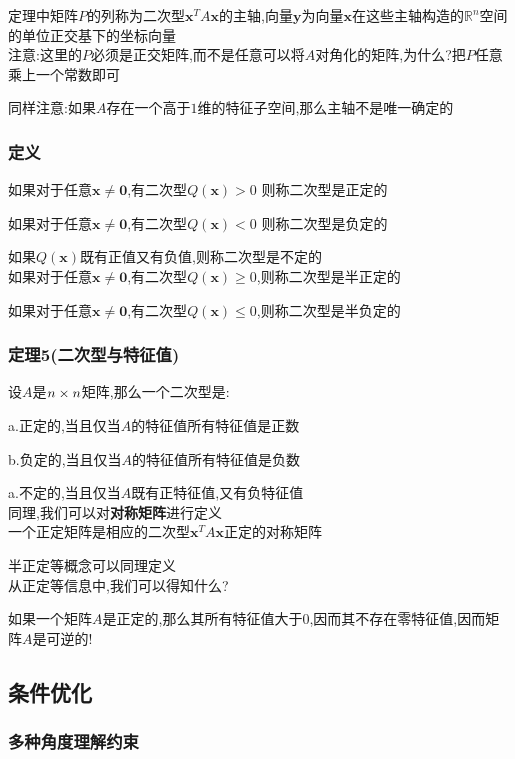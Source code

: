 \documentclass{article}
\newcommand{\RR}{\mathbb{R}}
\newcommand{\ve}{\boldsymbol}
\begin{document}
\begin{CJK}{UTF8}{gkai}
定理中矩阵$P$的列称为二次型$\ve{x}^T A \ve{x}$的主轴,向量$\ve{y}$为向量$\ve{x}$在这些主轴构造的$\RR^n$空间的单位正交基下的坐标向量\\

注意:这里的$P$必须是正交矩阵,而不是任意可以将$A$对角化的矩阵,为什么?把$P$任意乘上一个常数即可

同样注意:如果$A$存在一个高于$1$维的特征子空间,那么主轴不是唯一确定的
\subsubsection{定义}

如果对于任意$\ve{x} \neq \ve{0}$,有二次型$Q(\ve{x})> 0$ 则称二次型是正定的

如果对于任意$\ve{x} \neq \ve{0}$,有二次型$Q(\ve{x})< 0$ 则称二次型是负定的

如果$Q(\ve{x})$既有正值又有负值,则称二次型是不定的\\

如果对于任意$\ve{x} \neq \ve{0}$,有二次型$Q(\ve{x}) \geq 0$,则称二次型是半正定的

如果对于任意$\ve{x} \neq \ve{0}$,有二次型$Q(\ve{x}) \leq 0$,则称二次型是半负定的

\subsubsection{定理5(二次型与特征值)}
设$A$是$n\times n$矩阵,那么一个二次型是:

a.正定的,当且仅当$A$的特征值所有特征值是正数

b.负定的,当且仅当$A$的特征值所有特征值是负数

a.不定的,当且仅当$A$既有正特征值,又有负特征值\\

同理,我们可以对\textbf{对称矩阵}进行定义\\

一个正定矩阵是相应的二次型$\ve{x}^T A \ve{x}$正定的对称矩阵

半正定等概念可以同理定义\\

从正定等信息中,我们可以得知什么?

如果一个矩阵$A$是正定的,那么其所有特征值大于$0$,因而其不存在零特征值,因而矩阵$A$是可逆的!
\subsection{条件优化}
\subsubsection{多种角度理解约束}


\end{CJK}
\end{document}
